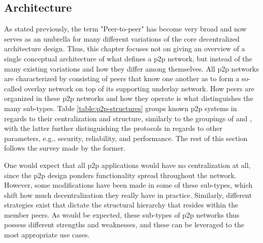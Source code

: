 \subsection{Architecture}

    As stated previously, the term "Peer-to-peer" has become very broad and now serves as an umbrella for many different variations of the core decentralized architecture design.
    Thus, this chapter focuses not on giving an overview of a single conceptual architecture of what defines a \gls{p2p} network, but instead of the many existing variations and how they differ among themselves.
    All \gls{p2p} networks are characterized by consisting of peers that know one another as to form a so-called overlay network on top of its supporting underlay network.
    How peers are organized in these \gls{p2p} networks and how they operate is what distinguishes the many sub-types.
    Table \ref{table:p2p-structures} groups known \gls{p2p} systems in regards to their centralization and structure, similarly to the groupings of \cite{p2p-survey-1} and \cite{p2p-survey-2}, with the latter further distinguishing the protocols in regards to other parameters, e.g., security, reliability, and performance.
    The rest of this section follows the survey made by the former.

    One would expect that all \gls{p2p} applications would have no centralization at all, since the \gls{p2p} design ponders functionality spread throughout the network.
    However, some modifications have been made in some of these sub-types, which shift how much decentralization they really have in practice.
    Similarly, different strategies exist that dictate the structural hierarchy that resides within the member peers.
    As would be expected, these sub-types of \gls{p2p} networks thus possess different strengths and weaknesses, and these can be leveraged to the most appropriate use cases.

